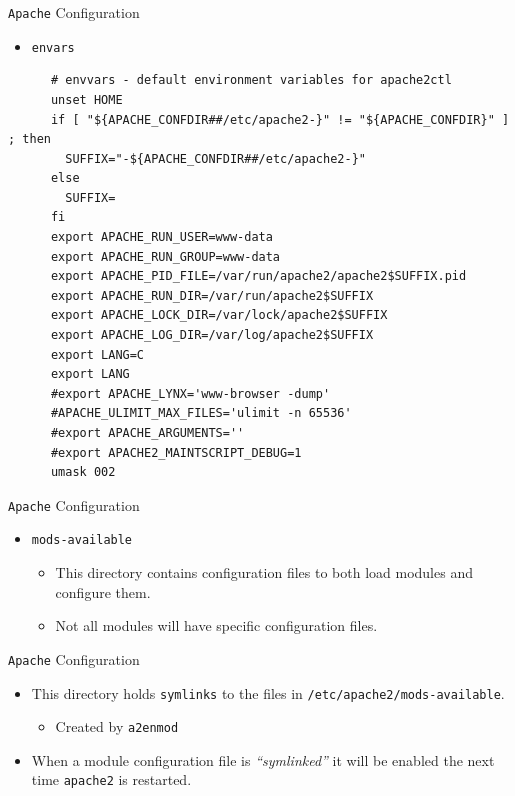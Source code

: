 \documentclass[xcolor=table,aspectratio=169]{beamer}
\begin{document}
\begin{frame}[fragile]{\texttt{Apache} Configuration}
  \begin{itemize}
    \item \texttt{envars}
  \end{itemize}
  \begin{tcolorbox}
    \lstset{
      basicstyle=\tiny\ttfamily,
    }
    \begin{lstlisting}
      # envvars - default environment variables for apache2ctl
      unset HOME
      if [ "${APACHE_CONFDIR##/etc/apache2-}" != "${APACHE_CONFDIR}" ] ; then
        SUFFIX="-${APACHE_CONFDIR##/etc/apache2-}"
      else
        SUFFIX=
      fi
      export APACHE_RUN_USER=www-data
      export APACHE_RUN_GROUP=www-data
      export APACHE_PID_FILE=/var/run/apache2/apache2$SUFFIX.pid
      export APACHE_RUN_DIR=/var/run/apache2$SUFFIX
      export APACHE_LOCK_DIR=/var/lock/apache2$SUFFIX
      export APACHE_LOG_DIR=/var/log/apache2$SUFFIX
      export LANG=C
      export LANG
      #export APACHE_LYNX='www-browser -dump'
      #APACHE_ULIMIT_MAX_FILES='ulimit -n 65536'
      #export APACHE_ARGUMENTS=''
      #export APACHE2_MAINTSCRIPT_DEBUG=1
      umask 002
    \end{lstlisting}
  \end{tcolorbox}
\end{frame}

\begin{frame}{\texttt{Apache} Configuration}
  \begin{itemize}
    \item \texttt{mods-available}
      \begin{itemize}
        \item This directory contains configuration files to both load modules and configure them. 
        \item Not all modules will have specific configuration files.
      \end{itemize}
  \end{itemize}
\end{frame}

\begin{frame}{\texttt{Apache} Configuration}
  \begin{itemize}
    \item This directory holds \texttt{symlinks} to the files in \texttt{/etc/apache2/mods-available}. 
      \begin{itemize}
        \item Created by \texttt{a2enmod}
      \end{itemize}
    \item When a module configuration file is \textit{``symlinked''} it will be enabled the next time \texttt{apache2} is restarted.
  \end{itemize}
\end{frame}
\end{document}
